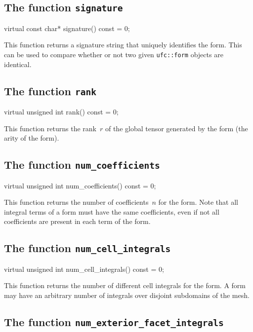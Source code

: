 \subsection{The function \texttt{signature}}

\begin{code}
virtual const char* signature() const = 0;
\end{code}

This function returns a signature string that uniquely identifies the
form. This can be used to compare whether or not two given
\texttt{ufc::form} objects are identical.

\subsection{The function \texttt{rank}}

\begin{code}
virtual unsigned int rank() const = 0;
\end{code}

This function returns the rank~$r$ of the global tensor generated by
the form (the arity of the form).

\subsection{The function \texttt{num\_coefficients}}

\begin{code}
virtual unsigned int num_coefficients() const = 0;
\end{code}

This function returns the number of coefficients~$n$ for the form.
Note that all integral terms of a form must have the same
coefficients, even if not all coefficients are present in each term of
the form.

\subsection{The function \texttt{num\_cell\_integrals}}

\begin{code}
virtual unsigned int num_cell_integrals() const = 0;
\end{code}

This function returns the number of different cell integrals for the
form. A form may have an arbitrary number of integrals over disjoint
subdomains of the mesh.

\subsection{The function \texttt{num\_exterior\_facet\_integrals}}

